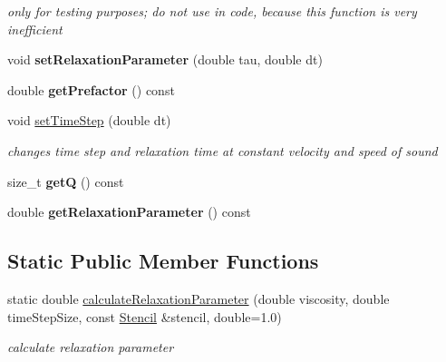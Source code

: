 \begin{DoxyCompactItemize}
\begin{DoxyCompactList}\small\item\em only for testing purposes; do not use in code, because this function is very inefficient \item\end{DoxyCompactList}\item 
\hypertarget{classnatrium_1_1BGK_acf54bde642d2dc1f83d700fc0a73d575}{
void {\bfseries setRelaxationParameter} (double tau, double dt)}
\label{classnatrium_1_1BGK_acf54bde642d2dc1f83d700fc0a73d575}

\item 
\hypertarget{classnatrium_1_1BGK_a67554c50c9f32d3b51f075988b809b4d}{
double {\bfseries getPrefactor} () const }
\label{classnatrium_1_1BGK_a67554c50c9f32d3b51f075988b809b4d}

\item 
\hypertarget{classnatrium_1_1BGK_a0bbb2526cbfc13c361333a9c32beb0a0}{
void \hyperlink{classnatrium_1_1BGK_a0bbb2526cbfc13c361333a9c32beb0a0}{setTimeStep} (double dt)}
\label{classnatrium_1_1BGK_a0bbb2526cbfc13c361333a9c32beb0a0}

\begin{DoxyCompactList}\small\item\em changes time step and relaxation time at constant velocity and speed of sound \item\end{DoxyCompactList}\item 
\hypertarget{classnatrium_1_1BGK_ab3069be02b1836b1e55c76054c4433a8}{
size\_\-t {\bfseries getQ} () const }
\label{classnatrium_1_1BGK_ab3069be02b1836b1e55c76054c4433a8}

\item 
\hypertarget{classnatrium_1_1BGK_adac002cf79a455f6b053b51210f39acb}{
double {\bfseries getRelaxationParameter} () const }
\label{classnatrium_1_1BGK_adac002cf79a455f6b053b51210f39acb}

\end{DoxyCompactItemize}
\subsection*{Static Public Member Functions}
\begin{DoxyCompactItemize}
\item 
static double \hyperlink{classnatrium_1_1BGK_a430f5020b6101a64d89a0cc2a246260e}{calculateRelaxationParameter} (double viscosity, double timeStepSize, const \hyperlink{classnatrium_1_1Stencil}{Stencil} \&stencil, double=1.0)
\begin{DoxyCompactList}\small\item\em calculate relaxation parameter \item\end{DoxyCompactList}\end{DoxyCompactItemize}



